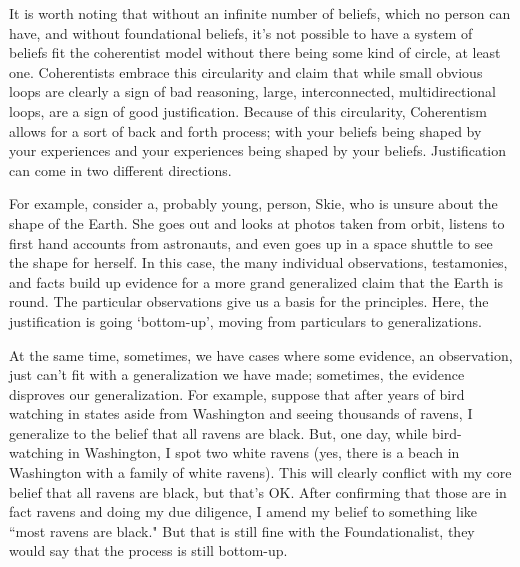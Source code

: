 It is worth noting that without an infinite number of beliefs, which no person can have, and without foundational beliefs, it's not possible to have a system of beliefs fit the coherentist model without there being some kind of circle, at least one. Coherentists embrace this circularity and claim that while small obvious loops are clearly a sign of bad reasoning, large, interconnected, multidirectional loops, are a sign of good justification. Because of this circularity, Coherentism allows for a sort of back and forth process; with your beliefs being shaped by your experiences and your experiences being shaped by your beliefs. Justification can come in two different directions. 

For example, consider a, probably young, person, Skie, who is unsure about the shape of the Earth. She goes out and looks at photos taken from orbit, listens to first hand accounts from astronauts, and even goes up in a space shuttle to see the shape for herself. In this case, the many individual observations, testamonies, and facts build up evidence for a more grand generalized claim that the Earth is round. The particular observations give us a basis for the principles. Here, the justification is going `bottom-up', moving from particulars to generalizations. 

At the same time, sometimes, we have cases where some evidence, an observation, just can't fit with a generalization we have made; sometimes, the evidence disproves our generalization. For example, suppose that after years of bird watching in states aside from Washington and seeing thousands of ravens, I generalize to the belief that all ravens are black. But, one day, while bird-watching in Washington, I spot two white ravens (yes, there is a beach in Washington with a family of white ravens). This will clearly conflict with my core belief that all ravens are black, but that's OK. After confirming that those are in fact ravens and doing my due diligence, I amend my belief to something like ``most ravens are black." But that is still fine with the Foundationalist, they would say that the process is still bottom-up.  


